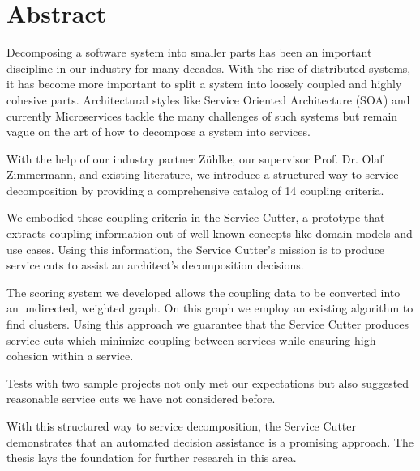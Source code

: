 \chapter{Abstract}

Decomposing a software system into smaller parts has been an important discipline in our industry for many decades. With the rise of distributed systems, it has become more important to split a system into loosely coupled and highly cohesive parts. Architectural styles like Service Oriented Architecture (SOA) and currently Microservices tackle the many challenges of such systems but remain vague on the art of how to decompose a system into services.

With the help of our industry partner Zühlke, our supervisor Prof. Dr. Olaf Zimmermann, and existing literature, we introduce a structured way to service decomposition by providing a comprehensive catalog of 14 coupling criteria.

We embodied these coupling criteria in the Service Cutter, a prototype that extracts coupling information out of well-known concepts like domain models and use cases. Using this information, the Service Cutter’s mission is to produce service cuts to assist an architect’s decomposition decisions. 

The scoring system we developed allows the coupling data to be converted into an undirected, weighted graph. On this graph we employ an existing algorithm to find clusters. Using this approach we guarantee that the Service Cutter produces service cuts which minimize coupling between services while ensuring high cohesion within a service. 

Tests with two sample projects not only met our expectations but also suggested reasonable service cuts we have not considered before. 

With this structured way to service decomposition, the Service Cutter demonstrates that an automated decision assistance is a promising approach. The thesis lays the foundation for further research in this area. 
